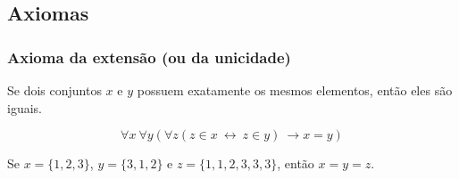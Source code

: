    \subsection{Axiomas}
      \subsubsection{Axioma da extensão (ou da unicidade)}
         \begin{stat}
            Se dois conjuntos $x$ e $y$ possuem exatamente os mesmos elementos, então eles são iguais.
         \end{stat}
         $$\forall x\ \forall y (\forall z (z \in x\ \leftrightarrow \ z \in y)\ \rightarrow x = y)$$
         \begin{exmp}
            Se $x = \{1, 2, 3\}$, $y = \{3,1,2\}$ e $z = \{1,1,2,3,3,3\}$, então $x = y = z$.
         \end{exmp}
         
